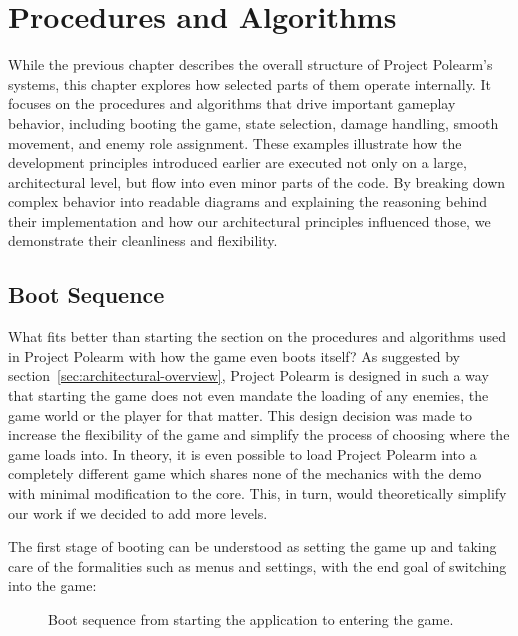 \documentclass[../Main.tex]{subfiles}
\begin{document}
\section{Procedures and Algorithms}\label{sec:procedures-and-algorithms}

While the previous chapter describes the overall structure of Project Polearm's systems, this chapter explores how selected parts of them operate internally. It focuses on the procedures and algorithms that drive important gameplay behavior, including booting the game, state selection, damage handling, smooth movement, and enemy role assignment. These examples illustrate how the development principles introduced earlier are executed not only on a large, architectural level, but flow into even minor parts of the code. By breaking down complex behavior into readable diagrams and explaining the reasoning behind their implementation and how our architectural principles influenced those, we demonstrate their cleanliness and flexibility.

\subsection{Boot Sequence}\label{sec:boot-sequence}

What fits better than starting the section on the procedures and algorithms used in Project Polearm with how the game even boots itself? As suggested by section~\ref{sec:architectural-overview}, Project Polearm is designed in such a way that starting the game does not even mandate the loading of any enemies, the game world or the player for that matter. This design decision was made to increase the flexibility of the game and simplify the process of choosing where the game loads into. In theory, it is even possible to load Project Polearm into a completely different game which shares none of the mechanics with the demo with minimal modification to the core. This, in turn, would theoretically simplify our work if we decided to add more levels.

The first stage of booting can be understood as setting the game up and taking care of the formalities such as menus and settings, with the end goal of switching into the game:

\begin{figure}[H]
    \centering
    
    \caption[Boot sequence from starting the application to entering the game. Own figure.]{Boot sequence from starting the application to entering the game.}
    \label{fig:boot-sequence}
\end{figure}
\end{document}
